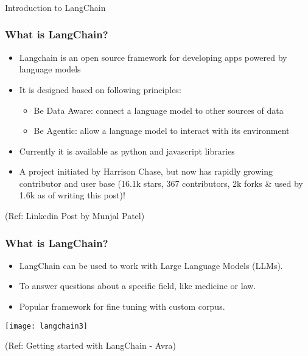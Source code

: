 \begin{frame}[fragile]\frametitle{}
\begin{center}
{\Large Introduction to LangChain}
\end{center}
\end{frame}

\begin{frame}\frametitle{What is LangChain?}

\begin{itemize}
\item Langchain is an open source framework for developing apps powered by language models
\item It is designed based on following principles:
	\begin{itemize}
	\item Be Data Aware: connect a language model to other sources of data
	\item Be Agentic: allow a language model to interact with its environment
	\end{itemize}
\item Currently it is available as python and javascript libraries
\item A project initiated by Harrison Chase, but now has rapidly growing contributor and user base (16.1k stars, 367 contributors, 2k forks \& used by 1.6k as of writing this post)!
\end{itemize}

{\tiny (Ref: Linkedin Post by Munjal Patel)}
\end{frame}

\begin{frame}\frametitle{What is LangChain?}

\begin{itemize}
\item LangChain can be used to work with Large Language Models (LLMs). 
\item To answer questions about a specific field, like medicine or law. 
\item Popular framework for fine tuning with custom corpus.
\end{itemize}

\begin{center}
\texttt{[image: langchain3]}
\end{center}	  


{\tiny (Ref: Getting started with LangChain - Avra)}
\end{frame}

